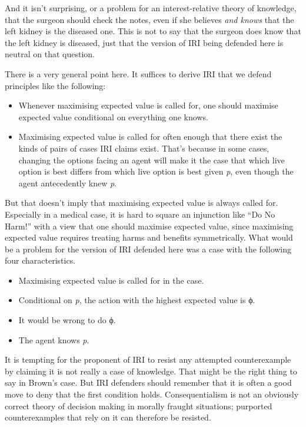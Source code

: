 \documentclass[
  10pt,
  letterpaper,
  DIV=11,
  numbers=noendperiod,
  twoside]{scrartcl}
\providecommand{\tightlist}{%
  \setlength{\itemsep}{0pt}\setlength{\parskip}{0pt}}\usepackage{longtable,booktabs,array}
\begin{document}
And it isn't surprising, or a problem for an interest-relative theory of
knowledge, that the surgeon should check the notes, even if she believes
\emph{and knows} that the left kidney is the diseased one. This is not
to say that the surgeon does know that the left kidney is diseased, just
that the version of IRI being defended here is neutral on that question.

There is a very general point here. It suffices to derive IRI that we
defend principles like the following:

\begin{itemize}
\tightlist
\item
  Whenever maximising expected value is called for, one should maximise
  expected value conditional on everything one knows.
\item
  Maximising expected value is called for often enough that there exist
  the kinds of pairs of cases IRI claims exist. That's because in some
  cases, changing the options facing an agent will make it the case that
  which live option is best differs from which live option is best given
  \emph{p}, even though the agent antecedently knew \emph{p}.
\end{itemize}

But that doesn't imply that maximising expected value is always called
for. Especially in a medical case, it is hard to square an injunction
like ``Do No Harm!'' with a view that one should maximise expected
value, since maximising expected value requires treating harms and
benefits symmetrically. What would be a problem for the version of IRI
defended here was a case with the following four characteristics.

\begin{itemize}
\tightlist
\item
  Maximising expected value is called for in the case.
\item
  Conditional on \emph{p}, the action with the highest expected value is
  ϕ.
\item
  It would be wrong to do ϕ.
\item
  The agent knows \emph{p}.
\end{itemize}

It is tempting for the proponent of IRI to resist any attempted
counterexample by claiming it is not really a case of knowledge. That
might be the right thing to say in Brown's case. But IRI defenders
should remember that it is often a good move to deny that the first
condition holds. Consequentialism is not an obviously correct theory of
decision making in morally fraught situations; purported counterexamples
that rely on it can therefore be resisted.
\end{document}
